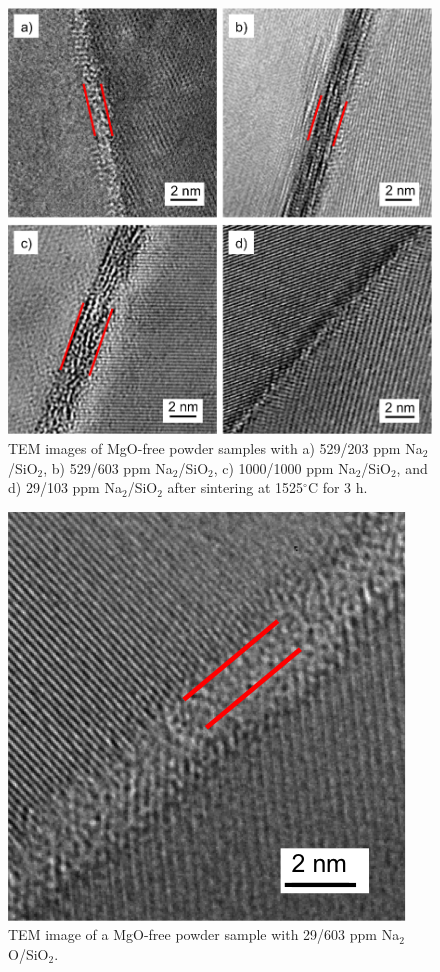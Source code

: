 \newpage
\begin{figure}[H]
	\centering
	\includegraphics[width=\textwidth]{Chapter-4/Figures/Figure10.png}
	\caption{TEM images of MgO-free powder samples with a) 529/203 ppm Na$_{2}$/SiO$_{2}$, b) 529/603 ppm Na$_{2}$/SiO$_{2}$, c) 1000/1000 ppm Na$_{2}$/SiO$_{2}$, and d) 29/103 ppm Na$_{2}$/SiO$_{2}$ after sintering at 1525$^{\circ}$C for 3 h.}
	\label{Ch4-figure:Figure10}
\end{figure}

\newpage
\begin{figure}[H]
	\centering
	\includegraphics{Chapter-4/Figures/Figure11.png}
	\caption{TEM image of a MgO-free powder sample with 29/603 ppm Na$_{2}$O/SiO$_{2}$.}
	\label{Ch4-figure:Figure11}
\end{figure}

